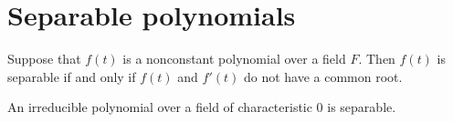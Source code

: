 \section{Separable polynomials}

\begin{thm}
    Suppose that $f(t)$ is a nonconstant polynomial over a field $F$.
    Then $f(t)$ is separable if and only if $f(t)$ and $f'(t)$ do not have a common root.
\end{thm}

\begin{thm}
    An irreducible polynomial over a field of characteristic 0 is separable.
\end{thm}